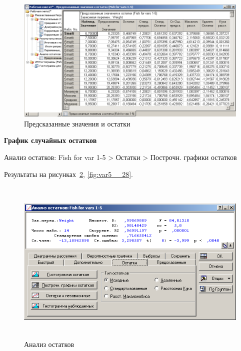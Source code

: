 \begin{figure}[!h]
  \centering

  \includegraphics[width=16cm]
  {inc/var5__26.PNG}

  \caption{Предсказанные значения и остатки}

  \label{fig:var5__26}
\end{figure}

\newpage

\begin{center}
  \textbf{График случайных остатков}
\end{center}

Анализ остатков: Fish for var 1-5 > Остатки > Построчн. графики остатков

Результаты на рисунках~\ref{fig:var5__27}, \ref{fig:var5__28}.

\begin{figure}[!h]
  \centering

  \includegraphics[height=8cm]
  {inc/var5__27.PNG}

  \caption{Анализ остатков}

  \label{fig:var5__27}
\end{figure}

